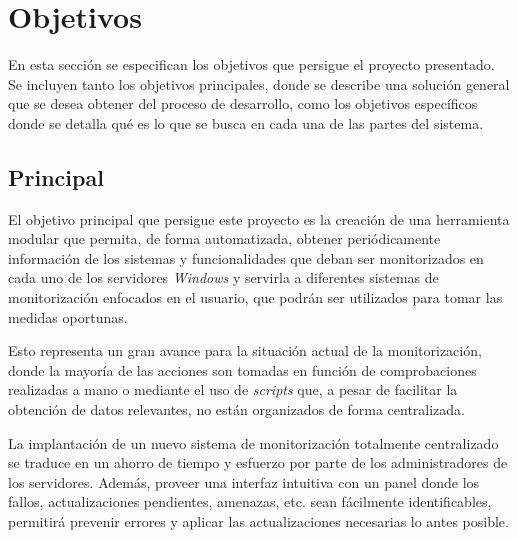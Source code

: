
\section{Objetivos} \label{sec:obj}
    En esta sección se especifican los objetivos que persigue el proyecto presentado. Se incluyen tanto los objetivos principales, donde se describe una solución general que se desea obtener del proceso de desarrollo, como los objetivos específicos donde se detalla qué es lo que se busca en cada una de las partes del sistema.

    \subsection{Principal}
        El objetivo principal que persigue este proyecto es la creación de una herramienta modular que permita, de forma automatizada, obtener periódicamente información de los sistemas y funcionalidades que deban ser monitorizados en cada uno de los servidores \textit{Windows} y servirla a diferentes sistemas de monitorización enfocados en el usuario, que podrán ser utilizados para tomar las medidas oportunas.
        
        Esto representa un gran avance para la situación actual de la monitorización, donde la mayoría de las acciones son tomadas en función de comprobaciones realizadas a mano o mediante el uso de \textit{scripts} que, a pesar de facilitar la obtención de datos relevantes, no están organizados de forma centralizada.
        
        La implantación de un nuevo sistema de monitorización totalmente centralizado se traduce en un ahorro de tiempo y esfuerzo por parte de los administradores de los servidores. Además, proveer una interfaz intuitiva con un panel donde los fallos, actualizaciones pendientes, amenazas, etc. sean fácilmente identificables, permitirá prevenir errores y aplicar las actualizaciones necesarias lo antes posible.
        
